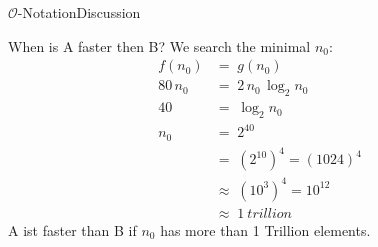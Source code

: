 
\begin{frame}{$\mathcal{O}$-Notation}{Discussion}
  \begin{block}{When is A faster then B?}%
    We search the minimal $n_0$:
    \begin{align*}%
      f(n_0) & = \; g(n_0)\\
      80 \, n_0 & = \; 2 \, n_0 \, \log_2 n_0\\
      40 & = \; \log_2 n_0\\
      n_0 & = \; 2^{40}\\
      {} & = \; (2^{10})^4 = (1024)^4\\
      {} & \approx \; (10^3)^4 = 10^{12}\\
      {} & \approx \; \SI{1}{trillion}
    \end{align*}
    A ist faster than B if $n_0$ has more than 1 Trillion elements.
  \end{block}
\end{frame}

